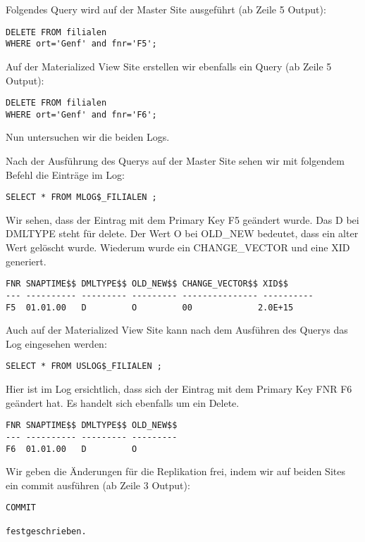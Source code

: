 \documentclass[11pt,a4paper,parskip=half]{scrartcl}
\begin{document}
Folgendes Query wird auf der Master Site ausgeführt (ab Zeile 5 Output):
\begin{lstlisting}
DELETE FROM filialen
WHERE ort='Genf' and fnr='F5'; 

\end{lstlisting}

Auf der Materialized View Site erstellen wir ebenfalls ein Query (ab Zeile 5 Output):
\begin{lstlisting}
DELETE FROM filialen
WHERE ort='Genf' and fnr='F6'; 

\end{lstlisting}

Nun untersuchen wir die beiden Logs.

Nach der Ausführung des Querys auf der Master Site sehen wir mit folgendem Befehl die Einträge im Log:
\begin{lstlisting}
SELECT * FROM MLOG$_FILIALEN ;
\end{lstlisting}

Wir sehen, dass der Eintrag mit dem Primary Key F5 geändert wurde. Das D bei DMLTYPE steht für delete. Der Wert O bei OLD\_NEW bedeutet, dass ein alter Wert gelöscht wurde. Wiederum wurde ein CHANGE\_VECTOR und eine XID generiert.
\begin{lstlisting}
FNR SNAPTIME$$ DMLTYPE$$ OLD_NEW$$ CHANGE_VECTOR$$ XID$$
--- ---------- --------- --------- --------------- ----------
F5  01.01.00   D         O         00             2.0E+15 
\end{lstlisting}

Auch auf der Materialized View Site kann nach dem Ausführen des Querys das Log eingesehen werden:
\begin{lstlisting}
SELECT * FROM USLOG$_FILIALEN ;
\end{lstlisting}

Hier ist im Log ersichtlich, dass sich der Eintrag mit dem Primary Key FNR F6 geändert hat. Es handelt sich ebenfalls um ein Delete.
\begin{lstlisting}
FNR SNAPTIME$$ DMLTYPE$$ OLD_NEW$$
--- ---------- --------- ---------
F6  01.01.00   D         O         
\end{lstlisting}

Wir geben die Änderungen für die Replikation frei, indem wir auf beiden Sites ein commit ausführen (ab Zeile 3 Output):
\begin{lstlisting}
COMMIT

festgeschrieben.
\end{lstlisting}
\end{document}
